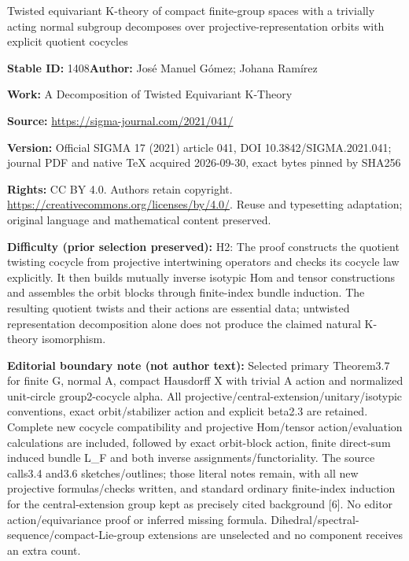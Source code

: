 \documentclass[11pt]{article}
\numberwithin{equation}{section}
\theoremstyle{definition}
\numberwithin{equation}{section}
\begin{document}
\begin{center}\Large Twisted equivariant K-theory of compact finite-group spaces with a trivially acting normal subgroup decomposes over projective-representation orbits with explicit quotient cocycles\end{center}
\noindent\textbf{Stable ID:} 1408\quad\textbf{Author:} José Manuel Gómez; Johana Ramírez\par
\noindent\textbf{Work:} A Decomposition of Twisted Equivariant K-Theory\par
\noindent\textbf{Source:} \url{https://sigma-journal.com/2021/041/}\par
\noindent\textbf{Version:} Official SIGMA 17 (2021) article 041, DOI 10.3842/SIGMA.2021.041; journal PDF and native TeX acquired 2026-09-30, exact bytes pinned by SHA256\par
\noindent\textbf{Rights:} CC BY 4.0. Authors retain copyright. \url{https://creativecommons.org/licenses/by/4.0/}. Reuse and typesetting adaptation; original language and mathematical content preserved.\par
\noindent\textbf{Difficulty (prior selection preserved):} {\CJKfont H2: The proof constructs the quotient twisting cocycle from projective intertwining operators and checks its cocycle law explicitly. It then builds mutually inverse isotypic Hom and tensor constructions and assembles the orbit blocks through finite-index bundle induction. The resulting quotient twists and their actions are essential data; untwisted representation decomposition alone does not produce the claimed natural K-theory isomorphism.}\par
\medskip\noindent\textbf{Editorial boundary note (not author text):} Selected primary Theorem3.7 for finite G, normal A, compact Hausdorff X with trivial A action and normalized unit-circle group2-cocycle alpha. All projective/central-extension/unitary/isotypic conventions, exact orbit/stabilizer action and explicit beta2.3 are retained. Complete new cocycle compatibility and projective Hom/tensor action/evaluation calculations are included, followed by exact orbit-block action, finite direct-sum induced bundle L\_F and both inverse assignments/functoriality. The source calls3.4 and3.6 sketches/outlines; those literal notes remain, with all new projective formulas/checks written, and standard ordinary finite-index induction for the central-extension group kept as precisely cited background [6]. No editor action/equivariance proof or inferred missing formula. Dihedral/spectral-sequence/compact-Lie-group extensions are unselected and no component receives an extra count.\par
\end{document}
